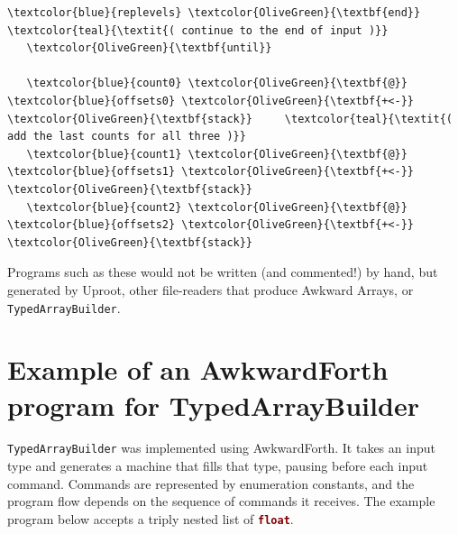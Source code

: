 \documentclass{webofc}
\begin{document}
\begin{Verbatim}[commandchars=\\\{\}]
     \textcolor{blue}{replevels} \textcolor{OliveGreen}{\textbf{end}}                 \textcolor{teal}{\textit{( continue to the end of input )}}
   \textcolor{OliveGreen}{\textbf{until}}

   \textcolor{blue}{count0} \textcolor{OliveGreen}{\textbf{@}} \textcolor{blue}{offsets0} \textcolor{OliveGreen}{\textbf{+<-}} \textcolor{OliveGreen}{\textbf{stack}}     \textcolor{teal}{\textit{( add the last counts for all three )}}
   \textcolor{blue}{count1} \textcolor{OliveGreen}{\textbf{@}} \textcolor{blue}{offsets1} \textcolor{OliveGreen}{\textbf{+<-}} \textcolor{OliveGreen}{\textbf{stack}}
   \textcolor{blue}{count2} \textcolor{OliveGreen}{\textbf{@}} \textcolor{blue}{offsets2} \textcolor{OliveGreen}{\textbf{+<-}} \textcolor{OliveGreen}{\textbf{stack}}
\end{Verbatim}
\normalsize

Programs such as these would not be written (and commented!) by hand, but generated by Uproot, other file-readers that produce Awkward Arrays, or {\tt TypedArrayBuilder}.

\vspace{-0.25 cm}
\section{Example of an AwkwardForth program for TypedArrayBuilder}

{\tt TypedArrayBuilder} was implemented using AwkwardForth. It takes an input type and generates a machine that fills that type, pausing before each input command. Commands are represented by enumeration constants, and the program flow depends on the sequence of commands it receives. The example program below accepts a triply nested list of \textcolor{Maroon}{\tt\textbf{float}}.
\end{document}
